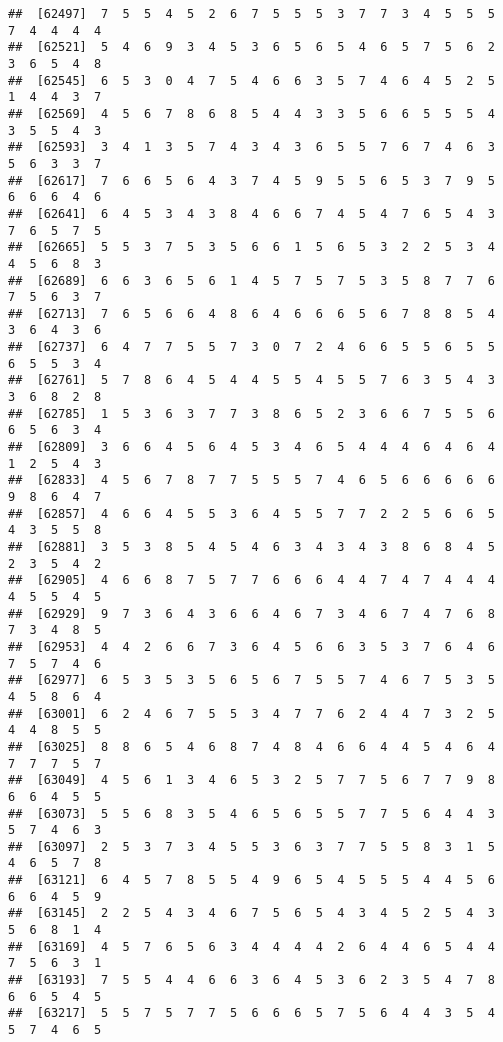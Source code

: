 \documentclass[
]{book}
\begin{document}
\begin{verbatim}
##  [62497]  7  5  5  4  5  2  6  7  5  5  5  3  7  7  3  4  5  5  5  7  4  4  4  4
##  [62521]  5  4  6  9  3  4  5  3  6  5  6  5  4  6  5  7  5  6  2  3  6  5  4  8
##  [62545]  6  5  3  0  4  7  5  4  6  6  3  5  7  4  6  4  5  2  5  1  4  4  3  7
##  [62569]  4  5  6  7  8  6  8  5  4  4  3  3  5  6  6  5  5  5  4  3  5  5  4  3
##  [62593]  3  4  1  3  5  7  4  3  4  3  6  5  5  7  6  7  4  6  3  5  6  3  3  7
##  [62617]  7  6  6  5  6  4  3  7  4  5  9  5  5  6  5  3  7  9  5  6  6  6  4  6
##  [62641]  6  4  5  3  4  3  8  4  6  6  7  4  5  4  7  6  5  4  3  7  6  5  7  5
##  [62665]  5  5  3  7  5  3  5  6  6  1  5  6  5  3  2  2  5  3  4  4  5  6  8  3
##  [62689]  6  6  3  6  5  6  1  4  5  7  5  7  5  3  5  8  7  7  6  7  5  6  3  7
##  [62713]  7  6  5  6  6  4  8  6  4  6  6  6  5  6  7  8  8  5  4  3  6  4  3  6
##  [62737]  6  4  7  7  5  5  7  3  0  7  2  4  6  6  5  5  6  5  5  6  5  5  3  4
##  [62761]  5  7  8  6  4  5  4  4  5  5  4  5  5  7  6  3  5  4  3  3  6  8  2  8
##  [62785]  1  5  3  6  3  7  7  3  8  6  5  2  3  6  6  7  5  5  6  6  5  6  3  4
##  [62809]  3  6  6  4  5  6  4  5  3  4  6  5  4  4  4  6  4  6  4  1  2  5  4  3
##  [62833]  4  5  6  7  8  7  7  5  5  5  7  4  6  5  6  6  6  6  6  9  8  6  4  7
##  [62857]  4  6  6  4  5  5  3  6  4  5  5  7  7  2  2  5  6  6  5  4  3  5  5  8
##  [62881]  3  5  3  8  5  4  5  4  6  3  4  3  4  3  8  6  8  4  5  2  3  5  4  2
##  [62905]  4  6  6  8  7  5  7  7  6  6  6  4  4  7  4  7  4  4  4  4  5  5  4  5
##  [62929]  9  7  3  6  4  3  6  6  4  6  7  3  4  6  7  4  7  6  8  7  3  4  8  5
##  [62953]  4  4  2  6  6  7  3  6  4  5  6  6  3  5  3  7  6  4  6  7  5  7  4  6
##  [62977]  6  5  3  5  3  5  6  5  6  7  5  5  7  4  6  7  5  3  5  4  5  8  6  4
##  [63001]  6  2  4  6  7  5  5  3  4  7  7  6  2  4  4  7  3  2  5  4  4  8  5  5
##  [63025]  8  8  6  5  4  6  8  7  4  8  4  6  6  4  4  5  4  6  4  7  7  7  5  7
##  [63049]  4  5  6  1  3  4  6  5  3  2  5  7  7  5  6  7  7  9  8  6  6  4  5  5
##  [63073]  5  5  6  8  3  5  4  6  5  6  5  5  7  7  5  6  4  4  3  5  7  4  6  3
##  [63097]  2  5  3  7  3  4  5  5  3  6  3  7  7  5  5  8  3  1  5  4  6  5  7  8
##  [63121]  6  4  5  7  8  5  5  4  9  6  5  4  5  5  5  4  4  5  6  6  6  4  5  9
##  [63145]  2  2  5  4  3  4  6  7  5  6  5  4  3  4  5  2  5  4  3  5  6  8  1  4
##  [63169]  4  5  7  6  5  6  3  4  4  4  4  2  6  4  4  6  5  4  4  7  5  6  3  1
##  [63193]  7  5  5  4  4  6  6  3  6  4  5  3  6  2  3  5  4  7  8  6  6  5  4  5
##  [63217]  5  5  7  5  7  7  5  6  6  6  5  7  5  6  4  4  3  5  4  5  7  4  6  5

\end{verbatim}
\end{document}
